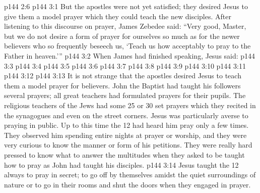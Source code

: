 \vs p144 2:6 
\vs p144 3:1 But the apostles were not yet satisfied; they desired Jesus to give them a model prayer which they could teach the new disciples. After listening to this discourse on prayer, James Zebedee said: “Very good, Master, but we do not desire a form of prayer for ourselves so much as for the newer believers who so frequently beseech us, ‘Teach us how acceptably to pray to the Father in heaven.’”
\vs p144 3:2 When James had finished speaking, Jesus said: 
\vspace*{1ex}
\vs p144 3:3 
\vs p144 3:4 \hsetoff {}
\vs p144 3:5 
\vs p144 3:6 \hsetoff {}
\vs p144 3:7 
\vs p144 3:8 \hsetoff {}
\vs p144 3:9 
\vs p144 3:10 \hsetoff {}
\vs p144 3:11 
\vs p144 3:12 \hsetoff {}
\vspace*{1ex}
\vs p144 3:13 \pc It is not strange that the apostles desired Jesus to teach them a model prayer for believers. John the Baptist had taught his followers several prayers; all great teachers had formulated prayers for their pupils. The religious teachers of the Jews had some 25 or 30 set prayers which they recited in the synagogues and even on the street corners. Jesus was particularly averse to praying in public. Up to this time the 12 had heard him pray only a few times. They observed him spending entire nights at prayer or worship, and they were very curious to know the manner or form of his petitions. They were really hard pressed to know what to answer the multitudes when they asked to be taught how to pray as John had taught his disciples.
\vs p144 3:14 Jesus taught the 12 always to pray in secret; to go off by themselves amidst the quiet surroundings of nature or to go in their rooms and shut the doors when they engaged in prayer.
